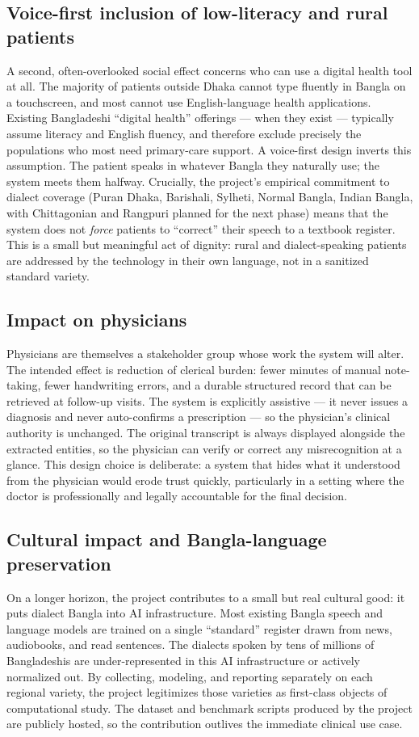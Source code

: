 \documentclass[12pt,a4paper]{article}
\begin{document}
\subsection{Voice-first inclusion of low-literacy and rural patients}
A second, often-overlooked social effect concerns who can use a
digital health tool at all. The majority of patients outside Dhaka
cannot type fluently in Bangla on a touchscreen, and most cannot use
English-language health applications. Existing Bangladeshi
``digital health'' offerings --- when they exist --- typically assume
literacy and English fluency, and therefore exclude precisely the
populations who most need primary-care support. A voice-first design
inverts this assumption. The patient speaks in whatever Bangla they
naturally use; the system meets them halfway. Crucially, the project's
empirical commitment to dialect coverage (Puran Dhaka, Barishali,
Sylheti, Normal Bangla, Indian Bangla, with Chittagonian and
Rangpuri planned for the next phase) means that the system does not
\emph{force} patients to ``correct'' their speech to a textbook
register. This is a small but meaningful act of dignity: rural and
dialect-speaking patients are addressed by the technology in their
own language, not in a sanitized standard variety.

\subsection{Impact on physicians}
Physicians are themselves a stakeholder group whose work the system
will alter. The intended effect is reduction of clerical burden:
fewer minutes of manual note-taking, fewer handwriting errors, and a
durable structured record that can be retrieved at follow-up visits.
The system is explicitly assistive --- it never issues a diagnosis
and never auto-confirms a prescription --- so the physician's
clinical authority is unchanged. The original transcript is always
displayed alongside the extracted entities, so the physician can
verify or correct any misrecognition at a glance. This design choice
is deliberate: a system that hides what it understood from the
physician would erode trust quickly, particularly in a setting
where the doctor is professionally and legally accountable for the
final decision.

\subsection{Cultural impact and Bangla-language preservation}
On a longer horizon, the project contributes to a small but real
cultural good: it puts dialect Bangla into AI infrastructure. Most
existing Bangla speech and language models are trained on a single
``standard'' register drawn from news, audiobooks, and read sentences.
The dialects spoken by tens of millions of Bangladeshis are
under-represented in this AI infrastructure or actively normalized
out. By collecting, modeling, and reporting separately on each
regional variety, the project legitimizes those varieties as
first-class objects of computational study. The dataset and
benchmark scripts produced by the project are publicly hosted, so the
contribution outlives the immediate clinical use case.
\end{document}
